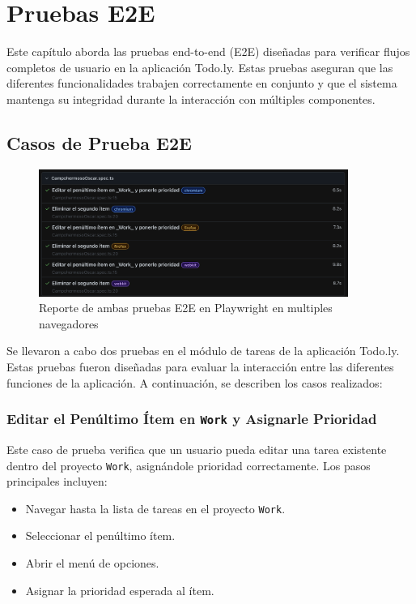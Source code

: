 \documentclass{report}
\begin{document}
\chapter{Pruebas E2E}

Este capítulo aborda las pruebas end-to-end (E2E) diseñadas para verificar flujos completos de usuario en la aplicación Todo.ly. Estas pruebas aseguran que las diferentes funcionalidades trabajen correctamente en conjunto y que el sistema mantenga su integridad durante la interacción con múltiples componentes.

\section{Casos de Prueba E2E}
\begin{figure}[h!]
    \centering
    \includegraphics[width=0.9\textwidth]{./imgs/playwright/Captura de pantalla 2024-11-17 a la(s) 21.49.35.png}
    \caption{Reporte de ambas pruebas E2E en Playwright en multiples navegadores}
    \label{fig:tcsplaywright}
\end{figure}

Se llevaron a cabo dos pruebas en el módulo de tareas de la aplicación Todo.ly. Estas pruebas fueron diseñadas para evaluar la interacción entre las diferentes funciones de la aplicación. A continuación, se describen los casos realizados:

\subsection{Editar el Penúltimo Ítem en \texttt{Work} y Asignarle Prioridad}

Este caso de prueba verifica que un usuario pueda editar una tarea existente dentro del proyecto \texttt{Work}, asignándole prioridad correctamente. Los pasos principales incluyen:
\begin{itemize}
    \item Navegar hasta la lista de tareas en el proyecto \texttt{Work}.
    \item Seleccionar el penúltimo ítem.
    \item Abrir el menú de opciones.
    \item Asignar la prioridad esperada al ítem.
\end{itemize}
\end{document}
